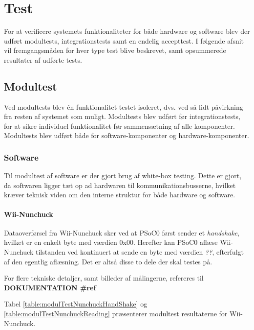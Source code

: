 \chapter{Test}
For at verificere systemets funktionaliteter for både hardware og software blev der udført modultests, integrationstests samt en endelig accepttest. I følgende afsnit vil fremgangsmåden for hver type test blive beskrevet, samt opsummerede resultater af udførte tests. 

\section{Modultest}
Ved modultests blev én funktionalitet testet isoleret, dvs. ved så lidt påvirkning fra resten af systemet som muligt. Modultests blev udført før integrationstests, for at sikre individuel funktionalitet før sammensætning af alle komponenter. Modultests blev udført både for software-komponenter og hardware-komponenter.

\subsection{Software}
Til modultest af software er der gjort brug af white-box testing. Dette er gjort, da softwaren ligger tæt op ad hardwaren til kommunikationsbusserne, hvilket kræver teknisk viden om den interne struktur for både hardware og software.

\subsubsection{Wii-Nunchuck}
Dataoverførsel fra Wii-Nunchuck sker ved at PSoC0 først sender et \textit{handshake}, hvilket er en enkelt byte med værdien 0x00. Herefter kan PSoC0 aflæse Wii-Nunchuck tilstanden ved kontinuert at sende en byte med værdien \textit{??}, efterfulgt af den egentlig aflæsning. Det er altså disse to dele der skal testes på.

For flere tekniske detaljer, samt billeder af målingerne, refereres til \textbf{DOKUMENTATION \#ref}

Tabel \ref{table:modulTestNunchuckHandShake} og \ref{table:modulTestNunchuckReading} præsenterer modultest resultaterne for Wii-Nunchuck.

